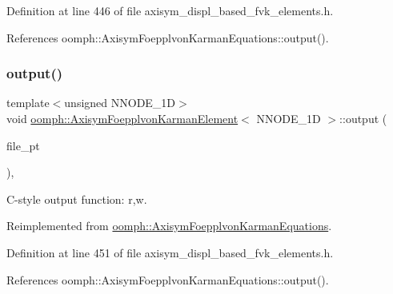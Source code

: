 Definition at line 446 of file axisym\+\_\+displ\+\_\+based\+\_\+fvk\+\_\+elements.\+h.



References oomph\+::\+Axisym\+Foepplvon\+Karman\+Equations\+::output().

\mbox{\label{classoomph_1_1AxisymFoepplvonKarmanElement_a17a94d66cf74c7be11d8e0a514db1d92}} 
\subsubsection{\texorpdfstring{output()}{output()}\hspace{0.1cm}{\footnotesize\ttfamily [7/8]}}
{\footnotesize\ttfamily template$<$unsigned N\+N\+O\+D\+E\+\_\+1D$>$ \\
void \hyperlink{classoomph_1_1AxisymFoepplvonKarmanElement}{oomph\+::\+Axisym\+Foepplvon\+Karman\+Element}$<$ N\+N\+O\+D\+E\+\_\+1D $>$\+::output (\begin{DoxyParamCaption}\item[{F\+I\+LE $\ast$}]{file\+\_\+pt }\end{DoxyParamCaption})\hspace{0.3cm}{\ttfamily [inline]}, {\ttfamily [virtual]}}



C-\/style output function\+: r,w. 



Reimplemented from \hyperlink{classoomph_1_1AxisymFoepplvonKarmanEquations_a236f169caf08c0214ff686e939b9dd33}{oomph\+::\+Axisym\+Foepplvon\+Karman\+Equations}.



Definition at line 451 of file axisym\+\_\+displ\+\_\+based\+\_\+fvk\+\_\+elements.\+h.



References oomph\+::\+Axisym\+Foepplvon\+Karman\+Equations\+::output().

\mbox{\label{classoomph_1_1AxisymFoepplvonKarmanElement_a09a7d0ec1c8c495c7703e6c034d8eafc}} 
